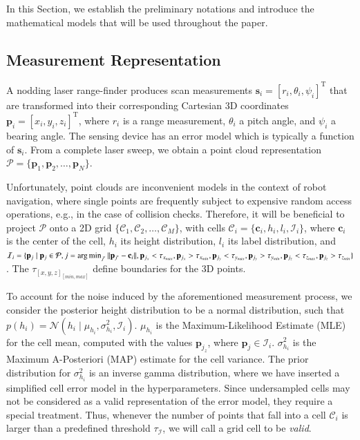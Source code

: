 In this Section, we establish the preliminary notations and introduce the
mathematical models that will be used throughout the paper.

\subsection{Measurement Representation}
A nodding laser range-finder produces scan measurements $\mathbf{s}_i=[r_i,
\theta_i,\psi_i]^\text{T}$ that are transformed into their corresponding
Cartesian 3D coordinates $\mathbf{p}_i=[x_i,y_i,z_i]^\text{T}$, where $r_i$ is
a range measurement, $\theta_i$ a pitch angle, and $\psi_i$ a bearing angle. The
sensing device has an error model which is typically a function of
$\mathbf{s}_i$. From a complete laser sweep, we obtain a point cloud
representation $\mathcal{P}=\{\mathbf{p}_1,\mathbf{p}_2,\dots,\mathbf{p}_N\}$.

Unfortunately, point clouds are inconvenient models in the context of robot
navigation, where single points are frequently subject to expensive random
access operations, e.g., in the case of collision checks. Therefore, it will be
beneficial to project $\mathcal{P}$ onto a 2D grid
$\{\mathcal{C}_1,\mathcal{C}_2,\dots,\mathcal{C}_M\}$, with cells
$\mathcal{C}_i=\{\mathbf{c}_i,h_i,l_i,\mathcal{I}_i\}$, where $\mathbf{c}_i$ is
the center of the cell, $h_i$ its height distribution, $l_i$ its label
distribution, and $\mathcal{I}_i=\{\mathbf{p}_j\mid\mathbf{p}_j\in\mathcal{P},
j=\operatorname*{arg\,min}_{j'}||\mathbf{p}_{j'}-\mathbf{c}_i||,\mathbf{p}_{j_x}<\tau_{x_{max}},
\mathbf{p}_{j_x}>\tau_{x_{min}},\mathbf{p}_{j_y}<\tau_{y_{max}},\mathbf{p}_{j_y}
>\tau_{y_{min}},\mathbf{p}_{j_z}<\tau_{z_{max}},\mathbf{p}_{j_z}>
\tau_{z_{min}}\}$. The $\tau_{[x,y,z]_{[min,max]}}$ define boundaries for the 3D
points.

To account for the noise induced by the aforementioned measurement process, we
consider the posterior height distribution to be a normal distribution, such
that $p(h_i)=\mathcal{N}(h_i\mid\mu_{h_i},\sigma^2_{h_i},\mathcal{I}_i)$.
$\mu_{h_i}$ is the Maximum-Likelihood Estimate (MLE) for the cell mean, computed
with the values $\mathbf{p}_{j_z}$, where $\mathbf{p}_j\in\mathcal{I}_i$.
$\sigma^2_{h_i}$ is the Maximum A-Posteriori (MAP) estimate for the cell
variance. The prior distribution for $\sigma^2_{h_i}$ is an inverse gamma
distribution, where we have inserted a simplified cell error model in the
hyperparameters. Since undersampled cells may not be considered as a valid
representation of the error model, they require a special treatment. Thus,
whenever the number of points that fall into a cell $\mathcal{C}_i$ is larger
than a predefined threshold $\tau_{\mathcal{I}}$, we will call a grid cell to be
\emph{valid}.

